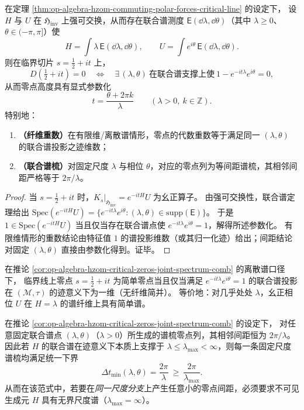 \begin{corollary}\label{cor:op-algebra-hzom-critical-zeros-joint-spectrum-comb}
在定理 \ref{thm:op-algebra-hzom-commuting-polar-forces-critical-line} 的设定下，
设 \(H\) 与 \(U\) 在 \(\mathfrak{H}_{\mathrm{inv}}\) 上强可交换，从而存在联合谱测度 \(\mathsf E(\dd\lambda,\dd\theta)\)（其中 \(\lambda\ge 0\)、\(\theta\in(-\pi,\pi]\)）使
\[
H=\int \lambda\,\mathsf E(\dd\lambda,\dd\theta),
\qquad
U=\int e^{i\theta}\,\mathsf E(\dd\lambda,\dd\theta).
\]
则在临界切片 \(s=\tfrac12+it\) 上，
\[
D(\tfrac12+it)=0
\quad\Longleftrightarrow\quad
\exists\,(\lambda,\theta)\ \text{在联合谱支撑上使}\ 1-e^{-it\lambda}e^{i\theta}=0,
\]
从而零点高度具有显式参数化
\[
\boxed{\ t=\frac{\theta+2\pi k}{\lambda}\qquad(\lambda>0,\ k\in\mathbb{Z}).\ }
\]
特别地：
\begin{enumerate}
  \item \textbf{（纤维重数）}在有限维/离散谱情形，零点的代数重数等于满足同一 \((\lambda,\theta)\) 的联合谱投影之迹维数；
  \item \textbf{（联合谱梳）}对固定尺度 \(\lambda\) 与相位 \(\theta\)，对应的零点列为等间距谱梳，其相邻间距严格等于 \(2\pi/\lambda\)。
\end{enumerate}
\end{corollary}
\begin{proof}
当 \(s=\tfrac12+it\) 时，\(K_s|_{\mathfrak{H}_{\mathrm{inv}}}=e^{-itH}U\) 为幺正算子。
由强可交换性，联合谱定理给出
\(
\mathrm{Spec}(e^{-itH}U)=\{e^{-it\lambda}e^{i\theta}:(\lambda,\theta)\in\mathrm{supp}(\mathsf E)\}
\)。
于是 \(1\in\mathrm{Spec}(e^{-itH}U)\) 当且仅当存在联合谱点使 \(e^{-it\lambda}e^{i\theta}=1\)，解得所述参数化。
有限维情形的重数结论由特征值 \(1\) 的谱投影维数（或其归一化迹）给出；间距结论对固定 \((\lambda,\theta)\) 直接由参数化得到。证毕。
\end{proof}

\begin{corollary}\label{cor:op-algebra-hzom-simple-zeros-joint-spectrum}
在推论 \ref{cor:op-algebra-hzom-critical-zeros-joint-spectrum-comb} 的离散谱口径下，
临界线上零点 \(s=\tfrac12+it\) 为简单零点当且仅当满足 \(e^{-it\lambda}e^{i\theta}=1\) 的联合谱投影在 \((\mathcal{M},\tau)\) 的迹意义下为一维（无纤维简并）。
等价地：对几乎处处 \(\lambda\)，幺正相位 \(U\) 在 \(H=\lambda\) 的谱纤维上具有简单谱。
\end{corollary}

\begin{corollary}\label{cor:op-algebra-hzom-zero-spacing-scale-lower-bound}
在推论 \ref{cor:op-algebra-hzom-critical-zeros-joint-spectrum-comb} 的设定下，
对任意固定联合谱点 \((\lambda,\theta)\)（\(\lambda>0\)）所生成的谱梳零点列，其相邻间距恒为 \(2\pi/\lambda\)。
因此若 \(H\) 的联合谱在迹意义下本质上支撑于 \(\lambda\le \lambda_{\max}<\infty\)，则每一条固定尺度谱梳均满足统一下界
\[
\boxed{\ \Delta t_{\min}(\lambda,\theta)=\frac{2\pi}{\lambda}\ \ge\ \frac{2\pi}{\lambda_{\max}}.\ }
\]
从而在该范式中，若要在\emph{同一尺度分支}上产生任意小的零点间距，必须要求不可见生成元 \(H\) 具有无界尺度谱（\(\lambda_{\max}=\infty\)）。
\end{corollary}

